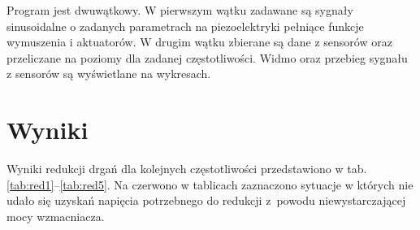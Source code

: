\documentclass[polish,a4paper,11pt]{mwart}
\let\Oldsection\section
\renewcommand{\section}{\FloatBarrier\Oldsection}
\begin{document}
Program jest dwuwątkowy. W pierwszym wątku zadawane są sygnały sinusoidalne o
zadanych parametrach na piezoelektryki pełniące funkcje wymuszenia i
aktuatorów. W drugim wątku zbierane są dane z sensorów oraz przeliczane na
poziomy \si{\decibelV} dla zadanej częstotliwości. Widmo oraz przebieg sygnału
z sensorów są wyświetlane na wykresach.

\section{Wyniki}

Wyniki redukcji drgań dla kolejnych częstotliwości przedstawiono w tab.
\ref{tab:red1}--\ref{tab:red5}. Na czerwono w tablicach zaznaczono sytuacje w
których nie udało się uzyskań napięcia potrzebnego do redukcji z~powodu
niewystarczającej mocy wzmacniacza.
\end{document}
